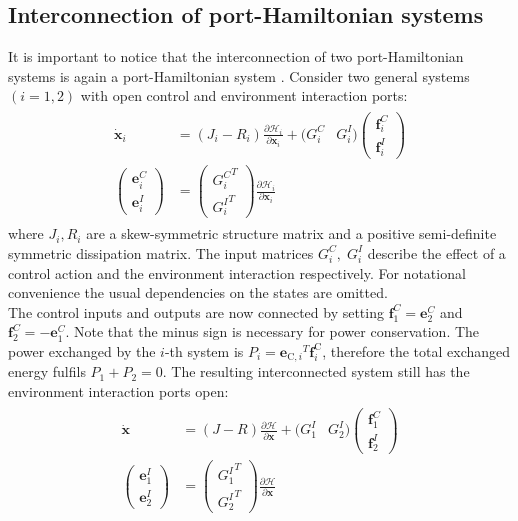 \documentclass[a4paper,twoside, openright,12pt]{report}
\newcommand{\f}[1]{\boldsymbol{#1}}
\newcommand{\g}[1]{\text{#1}}
\begin{document}
{\subsection{Interconnection of port-Hamiltonian systems}
It is important to notice that the interconnection of two port-Hamiltonian systems is again a port-Hamiltonian system \cite{Schaft_14}. Consider two general systems $(i=1,2)$ with open control and environment interaction ports:
\begin{eqnarray}
\begin{aligned}
	\dot{\f{x}}_i &= (J_i - R_i)\frac{\partial \mathcal{H}_i}{\partial \f{x}_i} + (G_i^C & G_i^I)\begin{pmatrix}\f{f}_i^C \\ \f{f}_i^I\end{pmatrix}\\
	\begin{pmatrix}\f{e}_i^C \\ \f{e}_i^I\end{pmatrix} &= \begin{pmatrix}{G_i^C}^T \\ {G_i^I}^T\end{pmatrix}\frac{\partial \mathcal{H}_i}{\partial \f{x}_i}
\end{aligned}
\end{eqnarray}
where $J_i,R_i$ are a skew-symmetric structure matrix and a positive semi-definite symmetric dissipation matrix. The input matrices $G_i^C,\; G_i^I$ describe the effect of a control action and the environment interaction respectively.
For notational convenience the usual dependencies on the states are omitted.\\
The control inputs and outputs are now connected by setting $\f{f}_1^C = \f{e}_2^C $ and $ \f{f}_2^C = -\f{e}_1^C $. Note that the minus sign is necessary for power conservation. The power exchanged by the $i$-th system is $P_i = {\f{e}_{\g{C},i}}^T\f{f}_i^\g{C}$, therefore the total exchanged energy fulfils $ P_1 + P_2 = 0 $. The resulting interconnected system still has the environment interaction ports open:
\begin{eqnarray}
\begin{aligned}
	\dot{\f{x}} &= (J - R)\frac{\partial \mathcal{H}}{\partial \f{x}}+ (G_1^I & G_2^I)\begin{pmatrix}\f{f}_1^C \\ \f{f}_2^I\end{pmatrix}\\
	\begin{pmatrix}\f{e}_1^I \\ \f{e}_2^I\end{pmatrix} &= \begin{pmatrix}{G_1^I}^T \\ {G_2^I}^T\end{pmatrix}\frac{\partial \mathcal{H}}{\partial \f{x}}

\end{aligned}
\end{eqnarray}}
\end{document}
